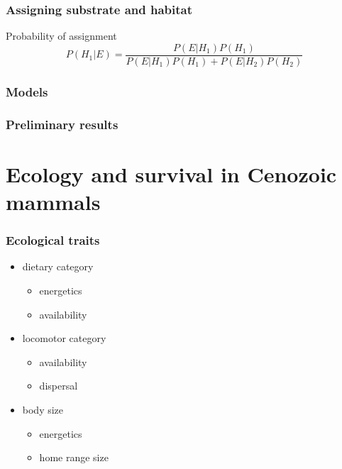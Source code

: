 \documentclass{beamer} \usepackage{amsmath,amsthm}
\begin{document}
\begin{frame}
  \frametitle{Assigning substrate and habitat}

  \begin{block}{Probability of assignment}
    \[
      P(H_{1}|E) = \frac{P(E|H_{1})P(H_{1})}{P(E|H_{1})P(H_{1}) + P(E|H_{2})P(H_{2})}
    \]
    \tiny{}
  \end{block}
\end{frame}

\begin{frame}
  \frametitle{Models}
\end{frame}

\begin{frame}
  \frametitle{Preliminary results}
\end{frame}


\section{Ecology and survival in Cenozoic mammals}

\begin{frame}
  \frametitle{Ecological traits}

  \begin{itemize}
    \item dietary category
      \begin{itemize}
        \item energetics
        \item availability
      \end{itemize}
    \item locomotor category
      \begin{itemize}
        \item availability
        \item dispersal
      \end{itemize}
    \item body size
      \begin{itemize}
        \item energetics
        \item home range size
      \end{itemize}
  \end{itemize}
\end{frame}
\end{document}
